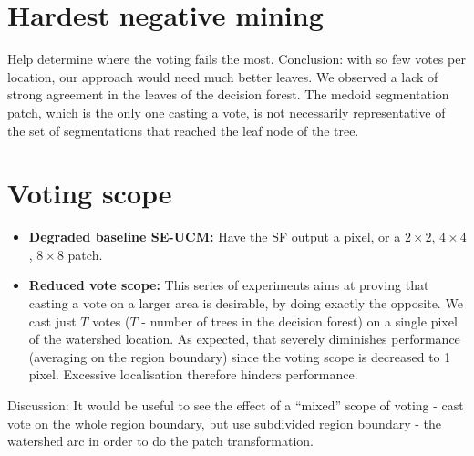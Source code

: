 \section{Hardest negative mining}
Help determine where the voting fails the most. Conclusion: with so few votes per location, our approach would need much better leaves. We observed a lack of strong agreement in the leaves of the decision forest. The medoid segmentation patch, which is the only one casting a vote, is not necessarily representative of the set of segmentations that reached the leaf node of the tree.

\section{Voting scope}
  \begin{itemize}
    \item{\bf Degraded baseline SE-UCM:} Have the SF output a pixel, or a $2\times2$, $4\times4$, $8\times8$ patch.
    \item{\bf Reduced vote scope:} This series of experiments aims at proving that casting a vote on a larger area is desirable, by doing exactly the opposite. We cast just $T$ votes ($T$ - number of trees in the decision forest) on a single pixel of the watershed location. As expected, that severely diminishes performance (\wrt averaging on the region boundary) since the voting scope is decreased to 1 pixel. Excessive localisation therefore hinders performance.
  \end{itemize}
Discussion: It would be useful to see the effect of a ``mixed'' scope of voting - cast vote on the whole region boundary, but use subdivided region boundary - the watershed arc in order to do the patch transformation.

